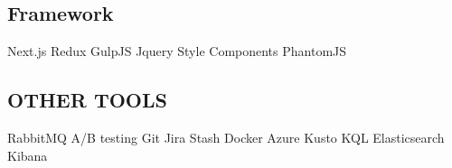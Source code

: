\documentclass[]{deedy-resume-openfont}
\begin{document}
\begin{minipage}[t]{0.33\textwidth}
\subsection{Framework}
Next.js \textbullet{} Redux \textbullet{} GulpJS \textbullet{} Jquery \textbullet{} Style Components \textbullet{} PhantomJS
\sectionsep
\subsection{OTHER TOOLS}
RabbitMQ \textbullet{} A/B testing \textbullet{} Git \textbullet{} Jira \textbullet{} Stash \textbullet{} Docker \textbullet{} Azure Kusto \textbullet{} KQL \textbullet{} Elasticsearch Kibana
\sectionsep



%
%

\end{minipage} 
\hfill
\end{document}
